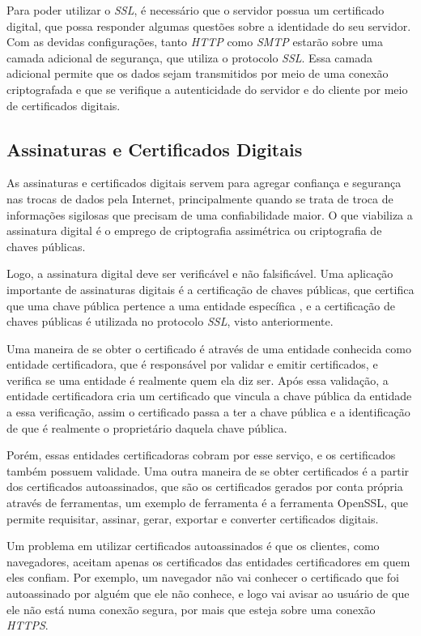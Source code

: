 Para poder utilizar o \textit{SSL}, é necessário que o servidor 
possua um certificado digital, que possa responder algumas questões sobre a 
identidade do seu servidor. Com as devidas configurações, tanto \textit{HTTP} como 
\textit{SMTP} estarão sobre uma camada adicional de segurança, que utiliza o 
protocolo \textit{SSL}. Essa camada adicional permite que os dados sejam 
transmitidos por meio de uma conexão criptografada e que se verifique a autenticidade
do servidor e do cliente por meio de certificados digitais. 

\subsection{Assinaturas e Certificados Digitais}

As assinaturas e certificados digitais servem para agregar confiança e segurança
nas trocas de dados pela Internet, principalmente quando se trata de troca de informações
sigilosas que precisam de uma confiabilidade maior. O que viabiliza a assinatura 
digital é o emprego de criptografia assimétrica ou criptografia de chaves públicas. 

Logo, a assinatura digital deve ser verificável e não falsificável. Uma
aplicação importante de assinaturas digitais é a certificação de chaves públicas,
que certifica que uma chave pública pertence a uma entidade específica \cite{kurose2010redes},
e a certificação de chaves públicas é utilizada no protocolo \textit{SSL}, visto anteriormente.

Uma maneira de se obter o certificado é através de uma entidade conhecida como
entidade certificadora, que é responsável por validar e emitir certificados, e
verifica se uma entidade é realmente quem ela diz ser. Após essa validação, a
entidade certificadora cria um certificado que vincula a chave pública da entidade
a essa verificação, assim o certificado passa a ter a chave pública e a
identificação de que é realmente o proprietário daquela chave pública.

Porém, essas entidades certificadoras cobram por esse serviço, e os certificados também
possuem validade. Uma outra maneira de se obter certificados é a partir dos certificados
autoassinados, que são os certificados gerados por conta própria através de
ferramentas, um exemplo de ferramenta é a ferramenta OpenSSL, que permite requisitar,
assinar, gerar, exportar e converter certificados digitais.

Um problema em utilizar certificados autoassinados é que os clientes, como navegadores,
aceitam apenas os certificados das entidades certificadores em quem eles confiam. Por
exemplo, um navegador não vai conhecer o certificado que foi autoassinado por
alguém que ele não conhece, e logo vai avisar ao usuário de que ele não está numa
conexão segura, por mais que esteja sobre uma conexão \textit{HTTPS}. 

